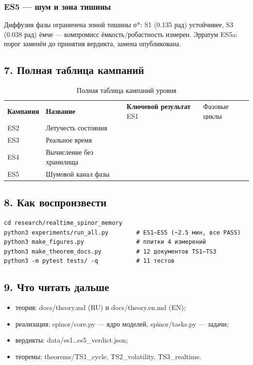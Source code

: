 \documentclass[11pt,a4paper]{article}
\begin{document}
\subsubsection{ES5 — шум и зона тишины}

Диффузия фазы ограничена зоной тишины σ*: S1 (0.135 рад) устойчивее, S3 (0.038 рад) ёмче — компромисс ёмкость/робастность измерен. Эрратум ES5a: порог заменён до принятия вердикта, замена опубликована.

\subsection{7. Полная таблица кампаний}

\begin{table}[htbp]\centering\small
\caption{Полная таблица кампаний уровня}
\begin{tabular}{p{} p{} p{}}
\toprule
\textbf{Кампания} & \textbf{Название} & \textbf{Ключевой результат}
\midrule
ES1 & Фазовые циклы &  \\
ES2 & Летучесть состояния &  \\
ES3 & Реальное время &  \\
ES4 & Вычисление без хранилища &  \\
ES5 & Шумовой канал фазы &  \\
\bottomrule
\end{tabular}
\end{table}

\subsection{8. Как воспроизвести}

\begin{verbatim}
cd research/realtime_spinor_memory
python3 experiments/run_all.py        # ES1–ES5 (~2.5 мин, все PASS)
python3 make_figures.py               # плитки 4 измерений
python3 make_theorem_docs.py          # 12 документов TS1–TS3
python3 -m pytest tests/ -q           # 11 тестов
\end{verbatim}

\subsection{9. Что читать дальше}

\begin{itemize}
  \item теория: docs/theory.md (RU) и docs/theory.en.md (EN);
  \item реализация: spinor/core.py — ядро моделей, spinor/tasks.py — задачи;
  \item вердикты: data/es1…es5\_verdict.json;
  \item теоремы: theorems/TS1\_cycle, TS2\_volatility, TS3\_realtime.
\end{itemize}
\end{document}
